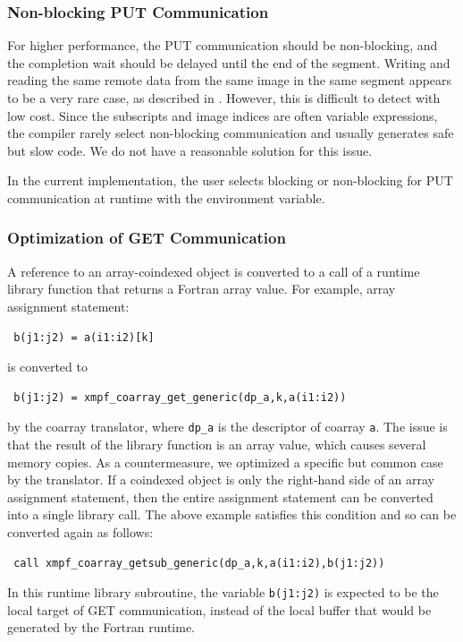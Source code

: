 \subsubsection{Non-blocking PUT Communication}

For higher performance, the PUT communication should be non-blocking, and
the completion wait should be delayed until the end of the segment.
Writing and reading the same remote data from
the same image in the same segment appears to be a very rare case, as described in .
However, this is difficult to detect with low cost. Since the subscripts and image
indices are often variable expressions, the compiler rarely select non-blocking communication
and usually generates safe but slow code.
We do not have a reasonable solution for this issue.

In the current implementation, the user selects blocking or non-blocking for
PUT communication at runtime with the environment variable.


\subsubsection{Optimization of GET Communication}\label{sec:opt-get}

A reference to an array-coindexed object is converted to a call of a runtime library 
function that returns a Fortran array value. For example, array assignment statement:
\begin{verbatim}
 b(j1:j2) = a(i1:i2)[k] 
\end{verbatim}
is converted to
\begin{verbatim}
 b(j1:j2) = xmpf_coarray_get_generic(dp_a,k,a(i1:i2)) 
\end{verbatim}
by the coarray translator, where {\tt dp\_a} is the descriptor of coarray {\tt a}.
The issue is that the result of the library function is an array value, which
causes several memory copies.
As a countermeasure, we optimized a specific but common case by the translator.
If a coindexed object is only the right-hand side of an array assignment statement, then
the entire assignment statement can be converted into a single library call.
The above example satisfies this condition and so can be converted again as follows:
\begin{verbatim}
 call xmpf_coarray_getsub_generic(dp_a,k,a(i1:i2),b(j1:j2)) 
\end{verbatim}
In this runtime library subroutine, the variable {\tt b(j1:j2)} is expected to be 
the local target of GET communication, instead of the local buffer that would be
generated by the Fortran runtime.


